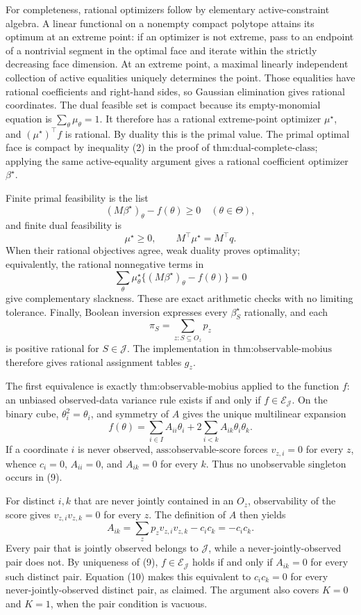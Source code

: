 For completeness, rational optimizers follow by elementary active-constraint algebra.  A linear functional on a nonempty compact polytope attains its optimum at an extreme point: if an optimizer is not extreme, pass to an endpoint of a nontrivial segment in the optimal face and iterate within the strictly decreasing face dimension.  At an extreme point, a maximal linearly independent collection of active equalities uniquely determines the point.  Those equalities have rational coefficients and right-hand sides, so Gaussian elimination gives rational coordinates.  The dual feasible set is compact because its empty-monomial equation is \(\sum_\theta\mu_\theta=1\).  It therefore has a rational extreme-point optimizer \(\mu^\star\), and \((\mu^\star)^\top f\) is rational.  By duality this is the primal value.  The primal optimal face is compact by inequality (2) in the proof of \(\text{thm:dual-complete-class}\); applying the same active-equality argument gives a rational coefficient optimizer \(\beta^\star\).

Finite primal feasibility is the list
\[
 (M\beta^\star)_\theta-f(\theta)\ge0
 \quad(\theta\in\Theta),
\]
and finite dual feasibility is
\[
 \mu^\star\ge0,\quad\quad M^\top\mu^\star=M^\top q.
\]
When their rational objectives agree, weak duality proves optimality; equivalently, the rational nonnegative terms in
\[
 \sum_\theta\mu^\star_\theta
       \{(M\beta^\star)_\theta-f(\theta)\}=0
\]
give complementary slackness.  These are exact arithmetic checks with no limiting tolerance.  Finally, Boolean inversion expresses every \(\beta_S^\star\) rationally, and each
\[
 \pi_S=\sum_{z:S\subseteq O_z}p_z
\]
is positive rational for \(S\in\mathcal J\).  The implementation in \(\text{thm:observable-mobius}\) therefore gives rational assignment tables \(g_z\).

The first equivalence is exactly \(\text{thm:observable-mobius}\) applied to the function \(f\): an unbiased observed-data variance rule exists if and only if \(f\in\mathcal E_{\mathcal J}\).  On the binary cube, \(\theta_i^2=\theta_i\), and symmetry of \(A\) gives the unique multilinear expansion
\[
 f(\theta)=\sum_{i\in I}A_{ii}\theta_i
       +2\sum_{i<k}A_{ik}\theta_i\theta_k. \tag{9}
\]
If a coordinate \(i\) is never observed, \(\text{ass:observable-score}\) forces \(v_{z,i}=0\) for every \(z\), whence \(c_i=0\), \(A_{ii}=0\), and \(A_{ik}=0\) for every \(k\).  Thus no unobservable singleton occurs in (9).

For distinct \(i,k\) that are never jointly contained in an \(O_z\), observability of the score gives \(v_{z,i}v_{z,k}=0\) for every \(z\).  The definition of \(A\) then yields
\[
 A_{ik}=\sum_zp_zv_{z,i}v_{z,k}-c_ic_k=-c_ic_k. \tag{10}
\]
Every pair that is jointly observed belongs to \(\mathcal J\), while a never-jointly-observed pair does not.  By uniqueness of (9), \(f\in\mathcal E_{\mathcal J}\) holds if and only if \(A_{ik}=0\) for every such distinct pair.  Equation (10) makes this equivalent to \(c_ic_k=0\) for every never-jointly-observed distinct pair, as claimed.  The argument also covers \(K=0\) and \(K=1\), when the pair condition is vacuous.

